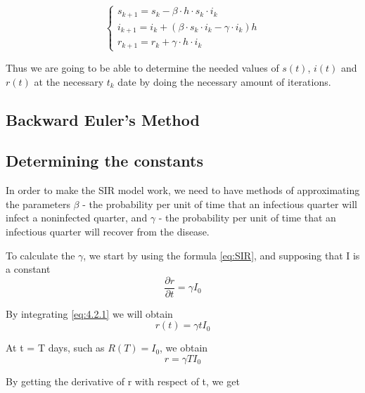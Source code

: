 \[
	\left\{
		\begin{array}{l}
			s_{k+1}=s_k - \beta \cdot h \cdot s_k \cdot i_k \\
			i_{k+1}=i_k + (\beta \cdot s_k \cdot i_k - \gamma \cdot i_k)h \\
			r_{k+1}=r_k+ \gamma \cdot h \cdot i_k
		\end{array}
	\right.
\]
\par
\par Thus we are going to be able to determine the needed values of $s(t)$, $i(t)$ and $r(t)$
at the necessary $t_k$ date by doing the necessary amount of iterations.

\subsection{Backward Euler's Method}

\subsection{Determining the constants}
\hspace{\parindent}In order to make the SIR model work, we need to have methods of approximating the parameters $\beta$ - the probability
per unit of time that an infectious quarter will infect a noninfected quarter, and $\gamma$ - the probability
per unit of time that an infectious quarter will recover from the disease.
\par
\par To calculate the $\gamma$, we start by using the formula \ref{eq:SIR}, and supposing that I is a constant
\begin{equation}
	\frac{\partial r}{\partial t} = \gamma I_0 \label{eq:4.2.1}
\end{equation}
\par By integrating \ref{eq:4.2.1} we will obtain
\begin{equation}
	r(t) = \gamma t I_0 \label{eq:4.2.2}
\end{equation}
\par At t = T days, such as $R(T)=I_0$, we obtain
\begin{equation}
	r = \gamma T I_0 \label{eq:4.2.3}
\end{equation}

\par By getting the derivative of r with respect of t, we get

